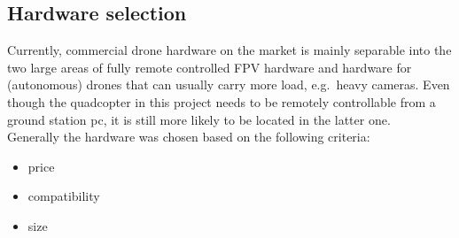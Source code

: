 \subsection{Hardware selection}\label{subsec:4_hardware_selection}
Currently, commercial drone hardware on the market is mainly separable into 
the two large areas of fully remote controlled \ac{FPV} hardware and hardware 
for (autonomous) drones that can usually carry more load, e.g.~heavy cameras.
Even though the quadcopter in this project needs to be remotely 
controllable from a ground station pc, it is still more likely to be located 
in the latter one.\\
Generally the hardware was chosen based on the following criteria:
\begin{itemize}
    \item price
    \item compatibility
    \item size
\end{itemize}

